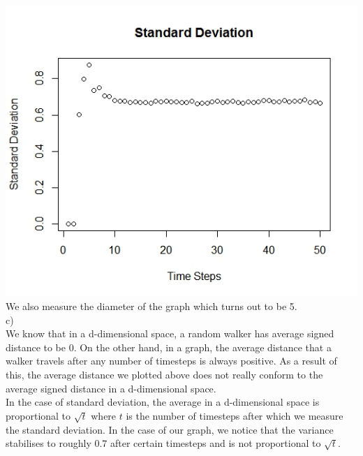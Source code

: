 \documentclass{article}
\begin{document}
\includegraphics[scale=0.4]{p1c} \\
We also measure the diameter of the graph which turns out to be 5.\\

c)\\
We know that in a d-dimensional space, a random walker has average signed distance to be 0.
On the other hand, in a graph, the average distance that a walker travels after any number of timesteps is 
always positive. As a result of this, the average distance we plotted above does not really conform to the
average signed distance in a d-dimensional space.\\

In the case of standard deviation, the average in a d-dimensional space is proportional to $\sqrt t$
where $t$ is the number of timesteps after which we measure the standard deviation. In the case of our graph,
we notice that the variance stabilises to roughly $0.7$ after certain timesteps and is not proportional to $\sqrt t$.\\
\end{document}
